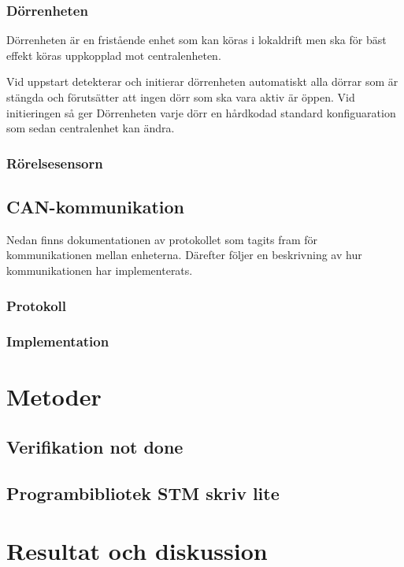 \documentclass{article}
\begin{document}
\subsubsection{Dörrenheten}
Dörrenheten är en fristående enhet som kan köras i lokaldrift
men ska för bäst effekt köras uppkopplad mot centralenheten.

Vid uppstart detekterar och initierar dörrenheten automatiskt alla dörrar som
är stängda och förutsätter att ingen dörr som ska vara aktiv är
öppen. Vid initieringen så ger Dörrenheten varje dörr en hårdkodad
standard konfiguaration som sedan centralenhet kan ändra. 
\subsubsection{Rörelsesensorn}
\subsection{CAN-kommunikation}
\label{can}
Nedan finns dokumentationen av protokollet som tagits fram för 
kommunikationen mellan enheterna. Därefter följer en beskrivning 
av hur kommunikationen har implementerats.
\subsubsection{Protokoll}

\subsubsection{Implementation}

\section{Metoder}
\subsection{Verifikation not done}
\subsection{Programbibliotek STM skriv lite}


\section{Resultat och diskussion} %
\end{document}

